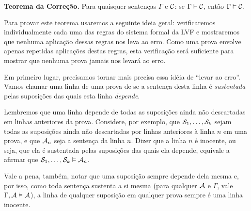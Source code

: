 \begin{factoidboxe}\textbf
	{Teorema da Correção.} Para quaisquer sentenças $\Gamma$ e $\mathcal{C}$: se $\Gamma\vdash\mathcal{C}$, então $\Gamma \vDash\mathcal{C}$.
\end{factoidboxe}

Para provar este teorema usaremos a seguinte ideia geral:
verificaremos individualmente cada uma das regras do sistema formal da LVF e mostraremos que nenhuma aplicação dessas regras nos leva ao erro.
Como uma prova envolve apenas repetidas aplicações destas regras, esta verificação será suficiente para mostrar que nenhuma prova jamais nos levará ao erro.

Em primeiro lugar, precisamos tornar mais precisa essa idéia de ``levar ao erro''.
Vamos chamar uma linha de uma prova de  se a sentença desta linha é \textit{sustentada} pelas suposições das quais esta linha \textit{depende}.

Lembremos que uma linha depende de todas as suposições ainda não descartadas em linhas anteriores da prova.
Considere, por exemplo, que $\mathcal{S}_1, \ldots, \mathcal{S}_k$ sejam todas as suposições ainda não descartadas por linhas anteriores à linha $n$ em uma prova, e que $\mathcal{A}_n$ seja a sentença da linha $n$.
Dizer que a linha $n$ é inocente, ou seja, que ela é sustentada pelas suposições das quais ela depende, equivale a afirmar que $\mathcal{S}_1, \ldots, \mathcal{S}_k \vDash \mathcal{A}_n$.

Vale a pena, também, notar que uma suposição sempre depende dela mesma e, por isso, como toda sentença sustenta a si mesma (para qualquer $\mathcal{A}$ e $\Gamma$, vale $\Gamma, \mathcal{A} \vDash \mathcal{A}$), a linha de qualquer suposição em qualquer prova sempre é uma linha inocente.

